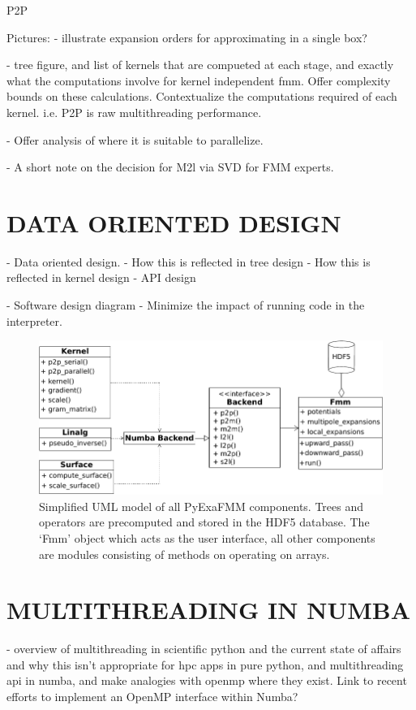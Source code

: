 \documentclass{IEEEcsmag}
\begin{document}
P2P

Pictures:
- illustrate expansion orders for approximating in a single box?

- tree figure, and list of kernels that are compueted at each stage, and exactly what the computations involve for kernel independent fmm. Offer complexity bounds on these calculations. Contextualize the computations required of each kernel. i.e. P2P is raw multithreading performance.

- Offer analysis of where it is suitable to parallelize.

- A short note on the decision for M2l via SVD for FMM experts.

\section{DATA ORIENTED DESIGN}

- Data oriented design.
- How this is reflected in tree design
- How this is reflected in kernel design
- API design

- Software design diagram
- Minimize the impact of running code in the interpreter.

\begin{figure}
    \centerline{\includegraphics {figures/software.pdf}}
    \caption{Simplified UML model of all PyExaFMM components. Trees and operators are precomputed and stored in the HDF5 database. The `Fmm' object which acts as the user interface, all other components are modules consisting of methods on operating on arrays.}
    \label{fig:design}
\end{figure}

\section{MULTITHREADING IN NUMBA}

- overview of multithreading in scientific python and the current state of affairs and why this isn't appropriate for hpc apps in pure python, and multithreading api in numba, and make analogies with openmp where they exist. Link to recent efforts to implement an OpenMP interface within Numba? 
\end{document}
